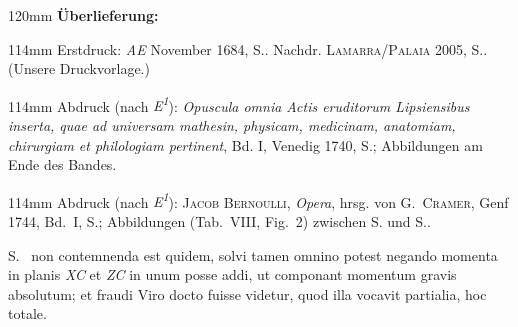 \begin{ledgroupsized}[r]{120mm}
\footnotesize
\pstart
\noindent\textbf{Überlieferung:}
\pend
\end{ledgroupsized}
\begin{ledgroupsized}[r]{114mm}
\footnotesize
\pstart
\parindent -6mm 
%
Erstdruck:
\cite{01023}\textit{AE} November 1684, S.. Nachdr. \textsc{Lamarra/Palaia} 2005, S..\cite{01289} (Unsere Druckvorlage.)%
\pend
\end{ledgroupsized}%
\begin{ledgroupsized}[r]{114mm}
\footnotesize
\pstart
\parindent -6mm
\parindent -6mm%
Abdruck (nach \textit{E\textsuperscript{1}}):
\cite{01421}\textit{Opuscula omnia Actis eruditorum Lipsiensibus inserta, quae ad universam mathesin, physicam, medicinam, anatomiam, chirurgiam et philologiam pertinent}, Bd. I, Venedig 1740, S.; Abbildungen am Ende des Bandes.
\pend
\end{ledgroupsized}%
\begin{ledgroupsized}[r]{114mm}
\footnotesize
\pstart
\parindent -6mm%
Abdruck (nach \textit{E\textsuperscript{1}}):
\cite{02005}\textsc{Jacob Bernoulli}, \textit{Opera},
hrsg. von G.~\textsc{Cramer}, Genf 1744,
Bd.~I, S.;
Abbildungen (Tab.~VIII, Fig.~2) zwischen S. und S..
\pend%
\end{ledgroupsized}
\vspace{8mm}
\pstart%
\noindent%
\lbrack S.\rbrack\  %
non contemnenda est
quidem, solvi tamen omnino potest negando momenta in planis \textit{XC} et \textit{ZC}
in unum posse addi, ut componant momentum
gravis absolutum; 
et fraudi Viro docto 
fuisse videtur, quod illa vocavit partialia, hoc totale.
